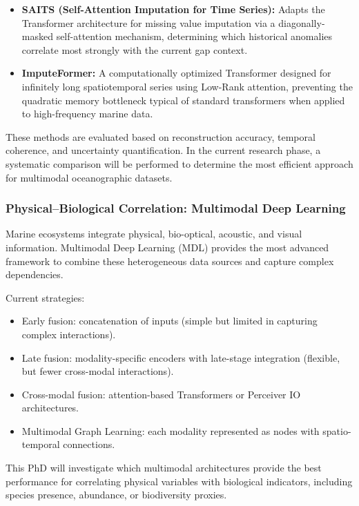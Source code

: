 \documentclass[12pt,a4paper]{article}
\begin{document}
\begin{itemize}[noitemsep]
\begin{itemize}
\begin{itemize}
            \item \textbf{SAITS (Self-Attention Imputation for Time Series):} Adapts the Transformer architecture for missing value imputation via a diagonally-masked self-attention mechanism, determining which historical anomalies correlate most strongly with the current gap context.
            \item \textbf{ImputeFormer:} A computationally optimized Transformer designed for infinitely long spatiotemporal series using Low-Rank attention, preventing the quadratic memory bottleneck typical of standard transformers when applied to high-frequency marine data.
        \end{itemize}
    \end{itemize}
\end{itemize}

These methods are evaluated based on reconstruction accuracy, temporal coherence, and uncertainty quantification. In the current research phase, a systematic comparison will be performed to determine the most efficient approach for multimodal oceanographic datasets.

\subsubsection{Physical–Biological Correlation: Multimodal Deep Learning}
Marine ecosystems integrate physical, bio-optical, acoustic, and visual information. Multimodal Deep Learning (MDL) provides the most advanced framework to combine these heterogeneous data sources and capture complex dependencies.

Current strategies:
\begin{itemize}[noitemsep]
    \item Early fusion: concatenation of inputs (simple but limited in capturing complex interactions).
    \item Late fusion: modality-specific encoders with late-stage integration (flexible, but fewer cross-modal interactions).
    \item Cross-modal fusion: attention-based Transformers or Perceiver IO architectures.
    \item Multimodal Graph Learning: each modality represented as nodes with spatio-temporal connections.
\end{itemize}

This PhD will investigate which multimodal architectures provide the best performance for correlating physical variables with biological indicators, including species presence, abundance, or biodiversity proxies.
\end{document}
